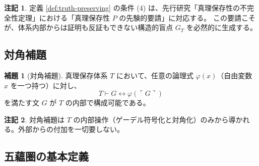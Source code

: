 \documentclass[11pt,a4paper]{article}
\theoremstyle{definition}
\newtheorem{lemma}{補題}[section]
\newtheorem{remark}{注記}[section]
\begin{document}
\begin{remark}
定義 \ref{def:truth-preserving} の条件 (4) は、先行研究「真理保存性の不完全性定理」における「真理保存性 $P$ の先験的要請」に対応する。
この要請こそが、体系内部からは証明も反証もできない構造的盲点 $G_T$ を必然的に生成する。
\end{remark}

\subsection{対角補題}

\begin{lemma}[対角補題]\label{lem:diagonal}
真理保存体系 $T$ において、任意の論理式 $\varphi(x)$（自由変数 $x$ を一つ持つ）に対し、
\begin{equation}
T \vdash G \leftrightarrow \varphi(\ulcorner G \urcorner)
\end{equation}
を満たす文 $G$ が $T$ の内部で構成可能である。
\end{lemma}

\begin{remark}
対角補題は $T$ の内部操作（ゲーデル符号化と対角化）のみから導かれる。外部からの付加を一切要しない。
\end{remark}

\subsection{五蘊圏の基本定義}
\end{document}
